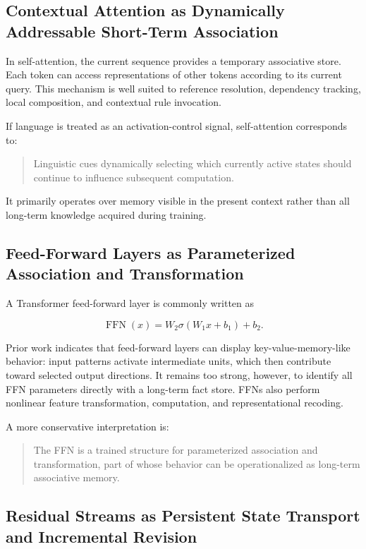 \documentclass[11pt, a4paper]{article}
\begin{document}
\subsection{Contextual Attention as Dynamically Addressable Short-Term Association}


In self-attention, the current sequence provides a temporary associative store. Each token can access representations of other tokens according to its current query. This mechanism is well suited to reference resolution, dependency tracking, local composition, and contextual rule invocation.


If language is treated as an activation-control signal, self-attention corresponds to:


\begin{quote}
Linguistic cues dynamically selecting which currently active states should continue to influence subsequent computation.
\end{quote}


It primarily operates over memory visible in the present context rather than all long-term knowledge acquired during training.


\subsection{Feed-Forward Layers as Parameterized Association and Transformation}


A Transformer feed-forward layer is commonly written as


\[
\operatorname{FFN}(x)
=
W_2\sigma(W_1x+b_1)+b_2.
\tag{11}
\]

Prior work indicates that feed-forward layers can display key-value-memory-like behavior: input patterns activate intermediate units, which then contribute toward selected output directions. It remains too strong, however, to identify all FFN parameters directly with a long-term fact store. FFNs also perform nonlinear feature transformation, computation, and representational recoding.


A more conservative interpretation is:


\begin{quote}
The FFN is a trained structure for parameterized association and transformation, part of whose behavior can be operationalized as long-term associative memory.
\end{quote}


\subsection{Residual Streams as Persistent State Transport and Incremental Revision}
\end{document}
